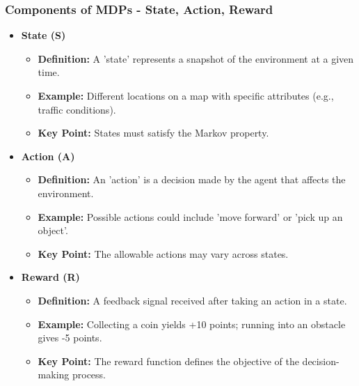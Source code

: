 \documentclass[aspectratio=169]{beamer}
\begin{document}
\begin{frame}[fragile]
    \frametitle{Components of MDPs - State, Action, Reward}
    \begin{itemize}
        \item \textbf{State (S)}
        \begin{itemize}
            \item \textbf{Definition:} A 'state' represents a snapshot of the environment at a given time.
            \item \textbf{Example:} Different locations on a map with specific attributes (e.g., traffic conditions).
            \item \textbf{Key Point:} States must satisfy the Markov property.
        \end{itemize}

        \item \textbf{Action (A)}
        \begin{itemize}
            \item \textbf{Definition:} An 'action' is a decision made by the agent that affects the environment.
            \item \textbf{Example:} Possible actions could include 'move forward' or 'pick up an object'.
            \item \textbf{Key Point:} The allowable actions may vary across states.
        \end{itemize}

        \item \textbf{Reward (R)}
        \begin{itemize}
            \item \textbf{Definition:} A feedback signal received after taking an action in a state.
            \item \textbf{Example:} Collecting a coin yields +10 points; running into an obstacle gives -5 points.
            \item \textbf{Key Point:} The reward function defines the objective of the decision-making process.
        \end{itemize}
    \end{itemize}
\end{frame}
\end{document}
